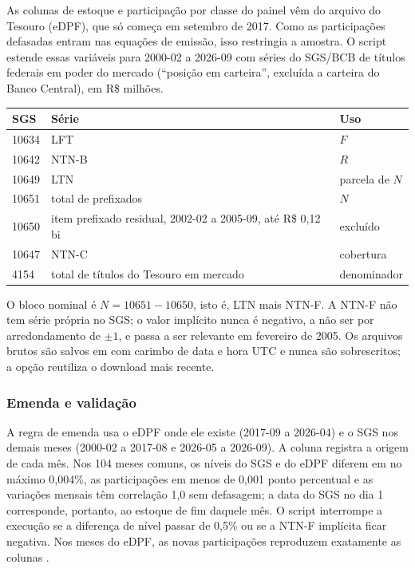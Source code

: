 \documentclass[12pt,a4paper]{article}
\begin{document}
As colunas de estoque e participação por classe do painel vêm do arquivo
 do Tesouro (eDPF), que só começa em setembro de 2017. Como as
participações defasadas entram nas equações de emissão, isso restringia a amostra.
O script  estende essas variáveis para
2000-02 a 2026-09 com séries do SGS/BCB de títulos federais em poder do mercado
(``posição em carteira'', excluída a carteira do Banco Central), em R\$ milhões.

\begin{longtable}{p{}p{}p{}}
\toprule
\textbf{SGS} & \textbf{Série} & \textbf{Uso} \\
\midrule
\endhead
10634 & LFT & \(F\) \\
10642 & NTN-B & \(R\) \\
10649 & LTN & parcela de \(N\) \\
10651 & total de prefixados & \(N\) \\
10650 & item prefixado residual, 2002-02 a 2005-09, até R\$ 0,12 bi & excluído \\
10647 & NTN-C & cobertura \\
4154 & total de títulos do Tesouro em mercado & denominador \\
\bottomrule
\end{longtable}

O bloco nominal é \(N = 10651 - 10650\), isto é, LTN mais NTN-F. A NTN-F não tem série
própria no SGS; o valor implícito nunca é negativo, a não ser por arredondamento de
\(\pm 1\), e passa a ser relevante em fevereiro de 2005. Os arquivos brutos são salvos
em  com carimbo de data e hora UTC e nunca são sobrescritos; a
opção  reutiliza o download mais recente.

\subsubsection{Emenda e validação}

A regra de emenda usa o eDPF onde ele existe (2017-09 a 2026-04) e o SGS nos demais
meses (2000-02 a 2017-08 e 2026-05 a 2026-09). A coluna 
registra a origem de cada mês. Nos 104 meses comuns, os níveis do SGS e do eDPF
diferem em no máximo 0,004\%, as participações em menos de 0,001 ponto percentual e
as variações mensais têm correlação 1,0 sem defasagem; a data do SGS no dia 1 corresponde,
portanto, ao estoque de fim daquele mês. O script interrompe a execução se a
diferença de nível passar de 0,5\% ou se a NTN-F implícita ficar negativa. Nos meses
do eDPF, as novas participações reproduzem exatamente as colunas .
\end{document}

